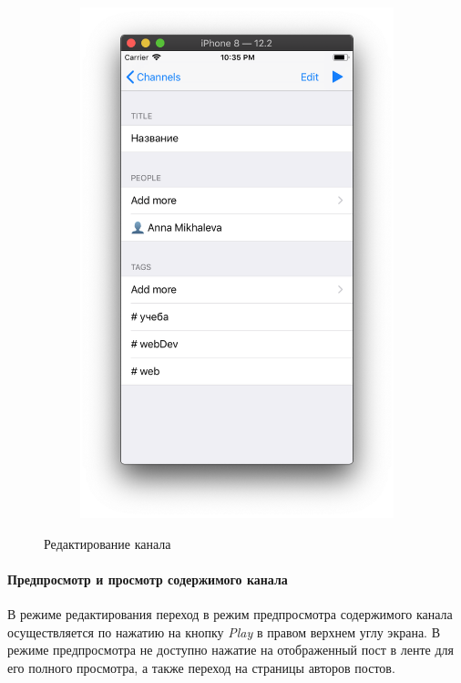 \documentclass[a4paper,12pt]{article}
\begin{document}
\begin{figure}[h!]
\begin{subfigure}[b]{0.3\linewidth}
			\includegraphics[width=\linewidth]{../includes/pmi/after_editing.png}
		\end{subfigure}
		\caption{\label{pic: editChannel}Редактирование канала}
	\end{figure}
	\clearpage
	\paragraph{Предпросмотр и просмотр содержимого канала\\}
	
	В режиме редактирования переход в режим предпросмотра содержимого канала осуществляется по нажатию на кнопку \textit{Play} в правом верхнем углу экрана. В режиме предпросмотра не доступно нажатие на отображенный пост в ленте для его полного просмотра, а также переход на страницы авторов постов.
	
\end{document}
